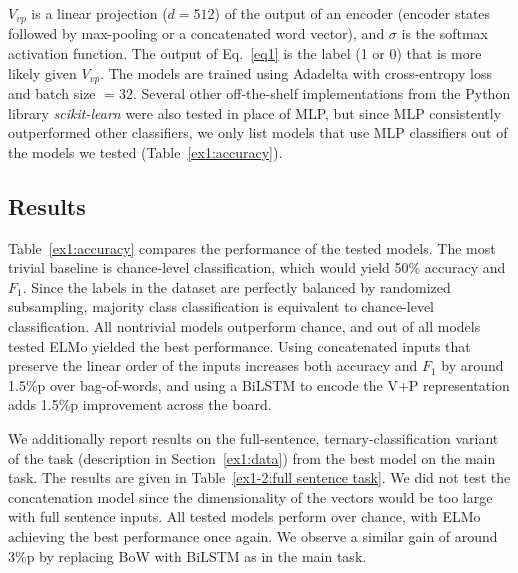 \documentclass[letterpaper]{article} %
\begin{document}
\noindent $V_{vp}$ is a linear projection ($d=512$) of the output of an encoder (encoder states followed by max-pooling or a concatenated word vector), and $\sigma$ is the softmax activation function. The output of Eq.~\ref{eq1} is the label (1 or 0) that is more likely given $V_{vp}$. The models are trained using Adadelta \cite{zeiler2012adadelta} with cross-entropy loss and batch size $=32$. Several other off-the-shelf implementations from the Python library \textit{scikit-learn} were also tested in place of MLP, but since MLP consistently outperformed other classifiers, we only list models that use MLP classifiers out of the models we tested (Table~\ref{ex1:accuracy}).

\subsection{Results}
Table~\ref{ex1:accuracy} compares the performance of the tested models. The most trivial baseline is chance-level classification, which would yield 50\% accuracy and $F_1$. Since the labels in the dataset are perfectly balanced by randomized subsampling, majority class classification is equivalent to chance-level classification. All nontrivial models outperform chance, and out of all models tested ELMo yielded the best performance. Using concatenated inputs that preserve the linear order of the inputs increases both accuracy and $F_1$ by around 1.5\%p over bag-of-words, and using a BiLSTM to encode the V+P representation adds 1.5\%p improvement across the board.


We additionally report results on the full-sentence, ternary-classification variant of the task (description in Section~\ref{ex1:data}) from the best model on the main task. The results are given in Table~\ref{ex1-2:full sentence task}. We did not test the concatenation model since the dimensionality of the vectors would be too large with full sentence inputs. All tested models perform over chance, with ELMo achieving the best performance once again. We observe a similar gain of around 3\%p by replacing BoW with BiLSTM as in the main task.
\end{document}
